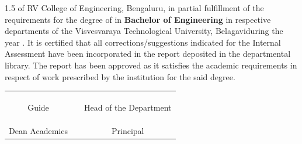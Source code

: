 \begin{spacing}{1.5}
{{{{{{					}\fi
				}\fi
	}\fi
	}\fi
	}\fi 
	}\fi of RV College of Engineering, Bengaluru, in partial fulfillment of the requirements for the degree of \ifPG \textbf{\printMastersInLF} in \textbf{\printMastersPrgName} \else\textbf{Bachelor of Engineering} in \ifIDP respective departments \else \textbf{\printDepartmentLF} \fi\fi \ifIDP \else of the Visvesvaraya Technological University, Belagavi\space\fi during the year \printAcadYear. It is certified that all corrections/suggestions indicated for the Internal Assessment have been incorporated in the \else {}\else{}\else{}\fi\fi\fi\fi report deposited in the departmental library. The \else{} \else {} \else {}\fi\fi\fi\fi report has been approved as it satisfies the academic requirements in respect of  \else{}\else{}\else{}\fi\fi\fi\fi work prescribed by the institution for the said degree. \par
\end{spacing}
\ifIDP
\begin{table}[H]
\centering
\begin{tabular}{ccc}
	& & \\
	& & \\
	\printGuideNameA & \hspace{0.15\textwidth} & \printHOD \\
	Guide & & Head of the Department \\
	& & \\
	& & \\
	\printDA & & \printPrincipal \\
	Dean Academics & & Principal \\
\end{tabular}%
\end{table}
